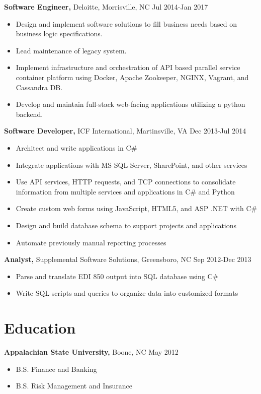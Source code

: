 \documentclass{res}
\begin{document}
\begin{resume}
  {\bf Software Engineer,} Deloitte, Morrisville, NC \hfill Jul 2014-Jan 2017
    \begin{itemize} \itemsep -2pt
     \item Design and implement software solutions to fill business needs based on business logic specifications.
     \item Lead maintenance of legacy system.
     \item Implement infrastructure and orchestration of API based parallel service container platform using Docker, Apache Zookeeper, NGINX, Vagrant, and Cassandra DB.
     \item Develop and maintain full-stack web-facing applications utilizing a python backend.
     \end{itemize}
  
  {\bf Software Developer,} ICF International, Martinsville, VA \hfill Dec 2013-Jul 2014
    \begin{itemize} \itemsep -2pt  %
      \item Architect and write applications in C\#
      \item Integrate applications with MS SQL Server, SharePoint, and other services
      \item Use API services, HTTP requests, and TCP connections to consolidate information from multiple services and applications in C\# and Python
      \item Create custom web forms using JavaScript, HTML5, and ASP .NET with C\#
      \item Design and build database schema to support projects and applications
      \item Automate previously manual reporting processes
    \end{itemize}

 
  {\bf Analyst,} Supplemental Software Solutions, Greensboro, NC \hfill  Sep 2012-Dec 2013
    \begin{itemize} \itemsep -2pt %
      \item Parse and translate EDI 850 output into SQL database using C\#
      \item Write SQL scripts and queries to organize data into customized formats
    \end{itemize}

    
\section{Education} 
  {\bf Appalachian State University,} Boone, NC \hfill May 2012
    \begin{itemize} \itemsep -2pt
      \item B.S. Finance and Banking
      \item B.S. Risk Management and Insurance
    \end{itemize}


\end{resume}
\end{document}
